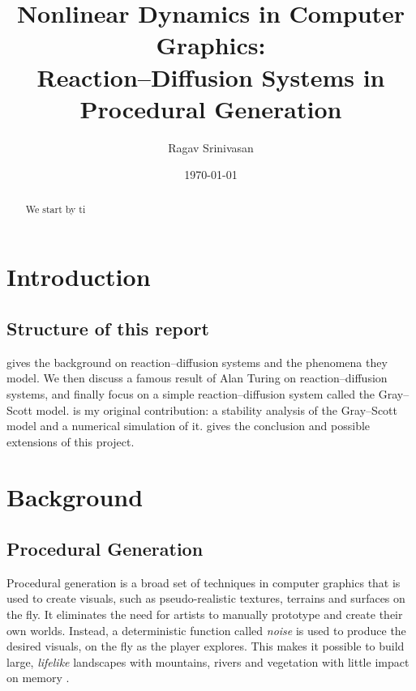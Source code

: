 \documentclass[a4paper, 11pt]{article}
\title{Nonlinear Dynamics in Computer Graphics:\\
       Reaction--Diffusion Systems in Procedural Generation}
\author{Ragav Srinivasan}
\date{\today}
\begin{document}
\maketitle

\begin{abstract}
	We start by ti
\end{abstract}

\section{Introduction}
\label{sec:introduction}



\subsection{Structure of this report}
 gives the background on reaction--diffusion systems and the phenomena they
model. We then discuss a famous result of Alan Turing on reaction--diffusion systems, and finally
focus on a simple reaction--diffusion system called the Gray--Scott model.
 is my original contribution: a stability analysis of the Gray--Scott model
and a numerical simulation of it.
 gives the conclusion and possible extensions of this project.
\section{Background}
\label{sec:background}




\subsection{Procedural Generation}
\label{sec:procedural}

Procedural generation is a broad set of techniques in computer graphics that is used to create visuals, such as pseudo-realistic textures, terrains and surfaces on the fly. It eliminates the need for artists to manually prototype and create their own worlds. Instead, a deterministic function called \emph{noise} is used to produce the desired visuals, on the fly as the player explores. This makes it possible to build large, \emph{lifelike} landscapes with mountains, rivers and vegetation with little impact on memory \parencite{lagae2010}.

\end{document}
